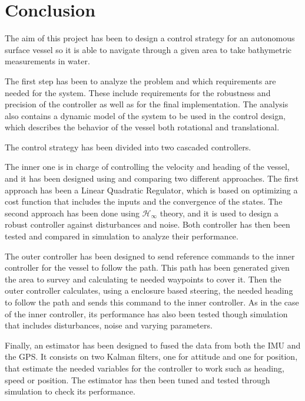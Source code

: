 \chapter{Conclusion}\label{chap:conclusion}

The aim of this project has been to design a control strategy for an autonomous surface vessel so it is able to navigate through a given area to take bathymetric measurements in water.

The first step has been to analyze the problem and which requirements are needed for the system. These include requirements for the robustness and precision of the controller as well as for the final implementation. The analysis also contains a dynamic model of the system to be used in the control design, which describes the behavior of the vessel both rotational and translational.

The control strategy has been divided into two cascaded controllers. 

The inner one is in charge of controlling the velocity and heading of the vessel, and it has been designed using and comparing two different approaches. The first approach has been a Linear Quadratic Regulator, which is based on optimizing a cost function that includes the inputs and the convergence of the states. The second approach has been done using $\mathcal{H}_\infty$ theory, and it is used to design a robust controller against disturbances and noise. Both controller has then been tested and compared in simulation to analyze their performance.

The outer controller has been designed to send reference commands to the inner controller for the vessel to follow the path. This path has been generated given the area to survey and calculating te needed waypoints to cover it. Then the outer controller calculates, using a enclosure based steering, the needed heading to follow the path and sends this command to the inner controller. As in the case of the inner controller, its performance has also been tested though simulation that includes disturbances, noise and varying parameters.

Finally, an estimator has been designed to fused the data from both the IMU and the GPS. It consists on two Kalman filters, one for attitude and one for position, that estimate the needed variables for the controller to work such as heading, speed or position. The estimator has then been tuned and tested through simulation to check its performance.

